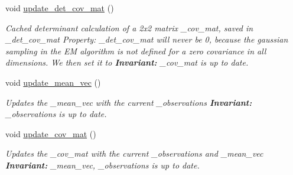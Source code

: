 \begin{DoxyCompactItemize}
\mbox{\label{classclara_1_1cone__state_ac04710abc3eba0e3688c70eaeab3f2ce}} 
void \hyperlink{classclara_1_1cone__state_ac04710abc3eba0e3688c70eaeab3f2ce}{update\+\_\+det\+\_\+cov\+\_\+mat} ()
\begin{DoxyCompactList}\small\item\em Cached determinant calculation of a 2x2 matrix {\ttfamily \+\_\+cov\+\_\+mat}, saved in {\ttfamily \+\_\+det\+\_\+cov\+\_\+mat} Property\+: {\ttfamily \+\_\+det\+\_\+cov\+\_\+mat} will never be 0, because the gaussian sampling in the EM algorithm is not defined for a zero covariance in all dimensions. We then set it to {} {\bfseries Invariant\+:} {\ttfamily \+\_\+cov\+\_\+mat} is up to date. \end{DoxyCompactList}\item 
void \hyperlink{classclara_1_1cone__state_ada683dbedcee79d84db8255ee5e71e6e}{update\+\_\+mean\+\_\+vec} ()
\begin{DoxyCompactList}\small\item\em Updates the {\ttfamily \+\_\+mean\+\_\+vec} with the current {\ttfamily \+\_\+observations} {\bfseries Invariant\+:} {\ttfamily \+\_\+observations} is up to date. \end{DoxyCompactList}\item 
void \hyperlink{classclara_1_1cone__state_a946bca664d068d7a82e3740eb736e948}{update\+\_\+cov\+\_\+mat} ()
\begin{DoxyCompactList}\small\item\em Updates the {\ttfamily \+\_\+cov\+\_\+mat} with the current {\ttfamily \+\_\+observations} and {\ttfamily \+\_\+mean\+\_\+vec} {\bfseries Invariant\+:} {\ttfamily \+\_\+mean\+\_\+vec}, {\ttfamily \+\_\+observations} is up to date. \end{DoxyCompactList}\end{DoxyCompactItemize}

